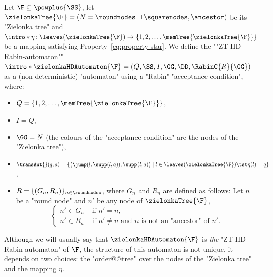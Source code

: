 \documentclass{theoretics}
\begin{document}
\begin{definition}\label{def-ZT: HD_Rabin_ZielonkaAutomaton}
	\AP Let $\F\subseteq \powplus{\SS}$, let $\zielonkaTree{\F} = (N = \roundnodes \sqcup \squarenodes, \ancestor)$ be its "Zielonka tree" and $\intro*\eta\colon \leaves(\zielonkaTree{\F}) \to \{1,2,\dots, \memTree{\zielonkaTree{\F}}\}$ be a mapping satisfying Property~\eqref{eq:property-star}.
	We define the ""ZT-HD-Rabin-automaton"" $\intro*\zielonkaHDAutomaton{\F}=(Q, \SS, I, \GG, \DD, \RabinC{R}{\GG})$ as a (non-deterministic) "automaton" using a "Rabin" "acceptance condition", where:
	\begin{itemize}
		\item $Q=\{1,2, \dots, \memTree{\zielonkaTree{\F}}\}$, 
		\item $I=Q$,\footnotemark{}
		\item $\GG = N$ (the colours of the "acceptance condition" are the nodes of the "Zielonka tree"),
		\item $\transAut{}(q,a) = \{\big(\jump(l,\supp(l,a)), \supp(l,a)\big) \mid l\in \leaves(\zielonkaTree{\F}) \tst \eta(l) = q\}$,
		\item $R = \{(G_n,R_n)\}_{n\in\roundnodes}$, where $G_n$ and $R_n$ are defined as follows: Let $n$ be a "round node" and $n'$ be any node of $\zielonkaTree{\F}$,
		\begin{equation*}
			\begin{cases}
				n' \in G_n & \text{ if } n'=n,\\
				n' \in R_n & \text{ if }  n'\neq n \text{ and } n \text{ is not an "ancestor" of } n'. 
			\end{cases}
		\end{equation*} 
	\end{itemize}
\end{definition}

\begin{remark}
	Although we will usually say that $\zielonkaHDAutomaton{\F}$ is \emph{the} "ZT-HD-Rabin-automaton" of $\F$, the structure of this automaton is not unique, it depends on two choices: the "order@@tree" over the nodes of the "Zielonka tree" and the mapping $\eta$.
\end{remark}
\end{document}
